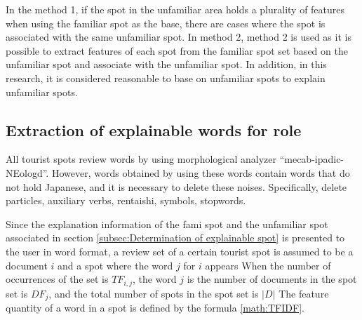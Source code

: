 \documentclass[journal]{IAENGtran}
\begin{document}
In the method 1, if the spot in the unfamiliar area holds a plurality of features when using the familiar spot as the base, there are cases where the spot is associated with the same unfamiliar spot.
In method 2, method 2 is used as it is possible to extract features of each spot from the familiar spot set based on the unfamiliar spot and associate with the unfamiliar spot.
In addition, in this research, it is considered reasonable to base on unfamiliar spots to explain unfamiliar spots.

\subsection{Extraction of explainable words for role}
\label{subsec:Extraction of explainable words for role}
All tourist spots review words by using morphological analyzer ``mecab-ipadic-NEologd''.
However, words obtained by using these words contain words that do not hold Japanese, and it is necessary to delete these noises.
Specifically, delete particles, auxiliary verbs, rentaishi, symbols, stopwords.

Since the explanation information of the fami
 spot and the unfamiliar spot associated in section \ref{subsec:Determination of explainable spot} is presented to the user in word format, a review set of a certain tourist spot is assumed to be a document $i$ and a spot where the word $j$ for $i$ appears When the number of occurrences of the set is $TF_{i,j}$, the word $j$ is the number of documents in the spot set is $DF_{j}$, and the total number of spots in the spot set is $|D|$ The feature quantity of a word in a spot is defined by the formula \ref{math:TFIDF}.
\end{document}

